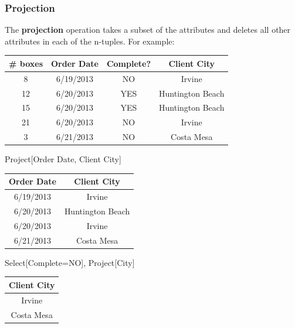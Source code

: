 \subsubsection*{Projection}
The \textbf{projection} operation takes a subset of the attributes and deletes all other attributes in each of the n-tuples.
For example:
\begin{center}
  \begin{tabular}{cccc}
    \# boxes & Order Date & Complete? & Client City      \\
    \hline
    8        & 6/19/2013  & NO        & Irvine           \\
    12       & 6/20/2013  & YES       & Huntington Beach \\
    15       & 6/20/2013  & YES       & Huntington Beach \\
    21       & 6/20/2013  & NO        & Irvine           \\
    3        & 6/21/2013  & NO        & Costa Mesa
  \end{tabular}
\end{center}
Project[Order Date, Client City]
\begin{center}
  \begin{tabular}{cc}
    Order Date & Client City      \\
    \hline
    6/19/2013  & Irvine           \\
    6/20/2013  & Huntington Beach \\
    6/20/2013  & Irvine           \\
    6/21/2013  & Costa Mesa
  \end{tabular}
\end{center}
Select[Complete=NO], Project[City]
\begin{center}
  \begin{tabular}{c}
    Client City \\
    \hline
    Irvine      \\
    Costa Mesa
  \end{tabular}
\end{center}